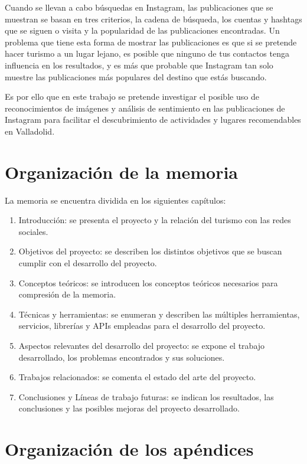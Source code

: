 Cuando se llevan a cabo búsquedas en Instagram, las publicaciones que se muestran se basan en tres criterios, la cadena de búsqueda, los cuentas y hashtags que se siguen o visita y la popularidad de las publicaciones encontradas. Un problema que tiene esta forma de mostrar las publicaciones es que si se pretende hacer turismo a un lugar lejano, es posible que ninguno de tus contactos tenga influencia en los resultados, y es más que probable que Instagram tan solo muestre las publicaciones más populares del destino que estás buscando.

Es por ello que en este trabajo se pretende investigar el posible uso de reconocimientos de imágenes y análisis de sentimiento en las publicaciones de Instagram para facilitar el descubrimiento de actividades y lugares recomendables en Valladolid.

\section{Organización de la memoria}
La memoria se encuentra dividida en los siguientes capítulos:

\begin{enumerate}
    \item Introducción: se presenta el proyecto y la relación del turismo con las redes sociales.
    \item Objetivos del proyecto: se describen los distintos objetivos que se buscan cumplir con el desarrollo del proyecto.
    \item Conceptos teóricos: se introducen los conceptos teóricos necesarios para compresión de la memoria.
    \item Técnicas y herramientas: se enumeran y describen las múltiples herramientas, servicios, librerías y APIs empleadas para el desarrollo del proyecto.
    \item Aspectos relevantes del desarrollo del proyecto: se expone el trabajo desarrollado, los problemas encontrados y sus soluciones.
    \item Trabajos relacionados: se comenta el estado del arte del proyecto.
    \item Conclusiones y Líneas de trabajo futuras: se indican los resultados, las conclusiones y las posibles mejoras del proyecto desarrollado.
\end{enumerate}

\section{Organización de los apéndices}
